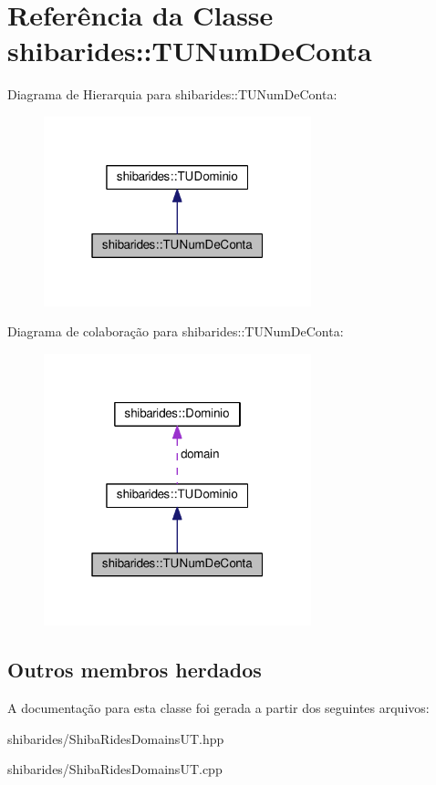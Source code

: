 \hypertarget{classshibarides_1_1TUNumDeConta}{}\section{Referência da Classe shibarides\+:\+:T\+U\+Num\+De\+Conta}
\label{classshibarides_1_1TUNumDeConta}


Diagrama de Hierarquia para shibarides\+:\+:T\+U\+Num\+De\+Conta\+:\nopagebreak
\begin{figure}[H]
\begin{center}
\leavevmode
\includegraphics[width=220pt]{classshibarides_1_1TUNumDeConta__inherit__graph}
\end{center}
\end{figure}


Diagrama de colaboração para shibarides\+:\+:T\+U\+Num\+De\+Conta\+:\nopagebreak
\begin{figure}[H]
\begin{center}
\leavevmode
\includegraphics[width=220pt]{classshibarides_1_1TUNumDeConta__coll__graph}
\end{center}
\end{figure}
\subsection*{Outros membros herdados}


A documentação para esta classe foi gerada a partir dos seguintes arquivos\+:\begin{DoxyCompactItemize}
\item 
shibarides/Shiba\+Rides\+Domains\+U\+T.\+hpp\item 
shibarides/Shiba\+Rides\+Domains\+U\+T.\+cpp\end{DoxyCompactItemize}
